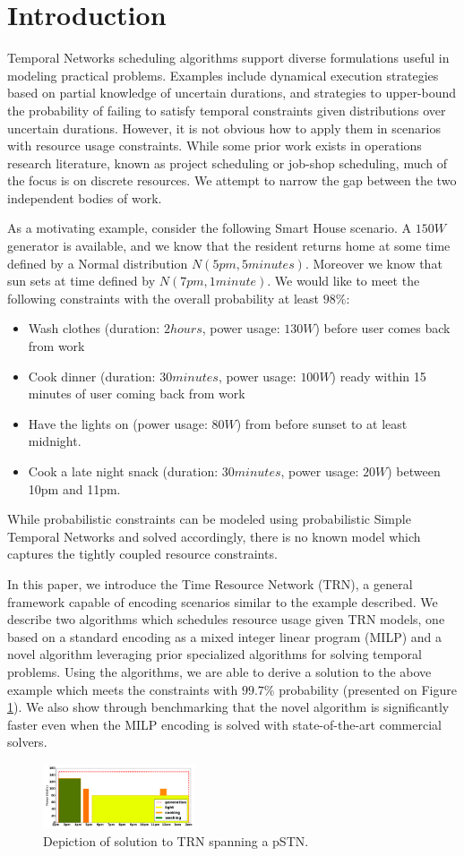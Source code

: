 \section{Introduction}
Temporal Networks scheduling algorithms support diverse formulations useful in modeling practical problems. Examples include dynamical execution strategies based on partial knowledge of uncertain durations, and strategies to upper-bound the probability of failing to satisfy temporal constraints given distributions over uncertain durations. However, it is not obvious how to apply them in scenarios with resource usage constraints. While some prior work exists in operations research literature, known as project scheduling or job-shop scheduling, much of the focus is on discrete resources. We attempt to narrow the gap between the two independent bodies of work.

As a motivating example, consider the following Smart House scenario. A $150W$ generator is available, and we know that the resident returns home at some time defined by a Normal distribution $N(5pm, 5minutes)$. Moreover we know that sun sets at time defined by $N(7pm, 1minute)$. We would like to meet the following constraints with the overall probability at least $98\%$:
\begin{itemize}
\setlength\itemsep{0.00em}

\item Wash clothes (duration: $2hours$, power usage: $130W$) before user comes back from work
\item Cook dinner (duration: $30minutes$, power usage: $100W$) ready within 15 minutes of user coming back from work
\item Have the lights on (power usage: $80W$) from before sunset to at least midnight.
\item Cook a late night snack (duration: $30minutes$, power usage: $20W$) between 10pm and 11pm.
\end{itemize}
While probabilistic constraints can be  modeled using probabilistic Simple Temporal Networks \cite{Fang2014} and solved accordingly, there is no known model which captures the tightly coupled resource constraints. 

In this paper, we introduce the Time Resource Network (TRN), a general framework capable of encoding scenarios similar to the example described. We describe two algorithms which schedules resource usage given TRN models, one based on a standard encoding as a mixed integer linear program (MILP) and a novel algorithm leveraging prior specialized algorithms for solving temporal problems. Using the algorithms, we are able to derive a solution to the above example which meets the constraints with $99.7\%$ probability (presented on Figure \ref{fig:pstnu_scheduling}). We also show through benchmarking that the novel algorithm is significantly faster even when the MILP encoding is solved with state-of-the-art commercial solvers. 


\begin{figure}[H]
\begin{center}
\includegraphics[width=0.4\textwidth]{pstnu_scheduling}
\caption{Depiction of solution to TRN spanning a pSTN.}
\label{fig:pstnu_scheduling}
\end{center}
\end{figure}
